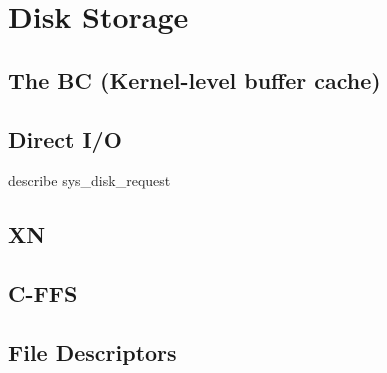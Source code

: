 
\section {Disk Storage}

\subsection {The BC (Kernel-level buffer cache)}



\subsection {Direct I/O}

describe sys\_disk\_request

\subsection {XN}



\subsection {C-FFS}



\subsection {File Descriptors}



